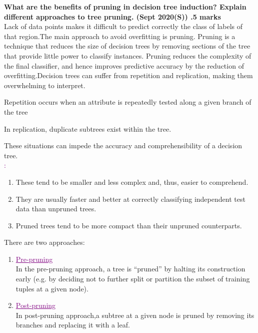 \textbf{\textcolor{LightMagenta}{What are the benefits of pruning in decision tree induction? Explain different
approaches to tree pruning. (Sept 2020(S)) .\hfill 5 marks}} \\[5pt]
Lack of data points makes it difficult to predict correctly the class of labels of that region.The main approach to avoid overfitting is pruning.
Pruning is a technique that reduces the size of decision trees by removing
sections of the tree that provide little power to classify instances. Pruning
reduces the complexity of the final classifier, and hence improves predictive
accuracy by the reduction of overfitting.Decision trees can suffer from repetition and replication, making them overwhelming to interpret.

Repetition occurs when an attribute is repeatedly tested along a given branch of the tree

In replication, duplicate subtrees exist within the tree.

These situations can impede the accuracy and comprehensibility of a decision tree.\\
\textcolor{purple}{\underline{}:}
\begin{enumerate}
    \item These tend to be smaller and less complex and, thus, easier to comprehend. 
    \item They are usually faster and better at correctly classifying independent test data than unpruned trees.
    \item Pruned trees tend to be more compact than their unpruned counterparts.
\end{enumerate}
There are two approaches:
\begin{enumerate}
    \item \textcolor{purple}{\underline{Pre-pruning}}\\
        In the pre-pruning approach, a tree is “pruned” by halting its construction early (e.g. by deciding not to further split or partition the subset of training tuples at a given node).
    \item \textcolor{purple}{\underline{Post-pruning}}\\
        In post-pruning approach,a subtree at a given node is pruned by removing its branches and replacing it with a leaf. 
\end{enumerate}